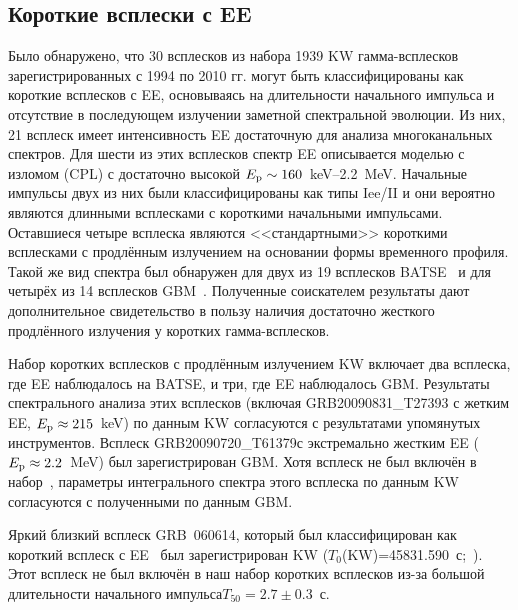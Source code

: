 \subsection{Короткие всплески с EE}
Было обнаружено, что 30 всплесков из набора 1939 KW гамма-всплесков зарегистрированных
с 1994 по 2010 гг. могут быть классифицированы как короткие всплесков с EE, 
основываясь на длительности начального импульса и отсутствие в последующем излучении 
заметной спектральной эволюции. Из них, 21 всплеск имеет интенсивность EE достаточную
для анализа многоканальных спектров. Для шести из этих всплесков спектр EE описывается
моделью с изломом (CPL) с достаточно высокой $E_{\mathrm{p}} \sim 160$~keV--2.2~MeV.
Начальные импульсы двух из них были классифицированы как типы Iee/II и они вероятно
являются длинными всплесками с короткими начальными импульсами. Оставшиеся четыре всплеска 
являются <<стандартными>> короткими всплесками с продлённым излучением на основании 
формы временного профиля. Такой же вид спектра был обнаружен для двух из 19 всплесков BATSE~\citep{Bostanci_2013MNRAS}
и для четырёх из 14 всплесков GBM~\citep{Kaneko_2015MNRAS}. 
Полученные соискателем результаты дают дополнительное свидетельство в пользу наличия 
достаточно жесткого продлённого излучения у коротких гамма-всплесков. 

Набор коротких всплесков с продлённым излучением KW включает два всплеска, 
где EE наблюдалось на BATSE, и три, где EE наблюдалось GBM. 
Результаты спектрального анализа этих всплесков (включая GRB20090831\_T27393 с жетким EE, 
$E_{\mathrm{p}} \approx 215$~keV) по данным KW согласуются с результатами упомянутых инструментов.
Всплеск GRB20090720\_T61379с экстремально жестким EE ($E_{\mathrm{p}} \approx 2.2$~MeV) 
был зарегистрирован GBM. Хотя всплеск не был включён в набор~\citep{Kaneko_2015MNRAS},
параметры интегрального спектра этого всплеска по данным KW согласуются с полученными 
по данным GBM.
 
Яркий близкий всплеск GRB~060614, который был классифицирован как короткий 
всплеск с EE~\citep{Gehrels_2006Nature} был зарегистрирован KW ($T_0$(KW)=45831.590~с;~\citep{Golenetskii_GCN5264}).
Этот всплеск не был включён в наш набор коротких всплесков из-за большой 
длительности начального импульса$T_{50}=2.7 \pm 0.3$~с.

